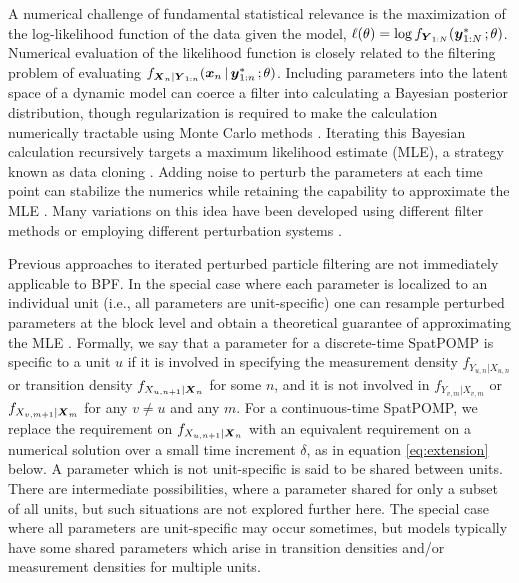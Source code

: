 \documentclass[12pt]{article}\usepackage[]{graphicx}\usepackage[]{xcolor}
\begin{document}
A numerical challenge of fundamental statistical relevance is the maximization of the log-likelihood function of the data given the model, $\ell(\theta)=\log f_{\boldsymbol{Y}_{1:N}}(\boldsymbol{y}^*_{1:N}{\hspace{0.5mm};\hspace{0.5mm}} \theta)$.
Numerical evaluation of the likelihood function is closely related to the filtering problem of evaluating $f_{\boldsymbol{X}_n|\boldsymbol{Y}_{1:n}}(\boldsymbol{x}_n{\,\vert\,} \boldsymbol{y}^*_{1:n}{\hspace{0.5mm};\hspace{0.5mm}} \theta)$.
Including parameters into the latent space of a dynamic model can coerce a filter into calculating a Bayesian posterior distribution, though regularization is required to make the calculation numerically tractable using Monte Carlo methods \citep{kitagawa98,janeliu01}.
Iterating this Bayesian calculation recursively targets a maximum likelihood estimate (MLE), a strategy known as data cloning \citep{lele07,lele10}.
Adding noise to perturb the parameters at each time point can stabilize the numerics while retaining the capability to approximate the MLE \citep{ionides06-pnas,ionides11,ionides15}.
Many variations on this idea have been developed using different filter methods \citep{park20,li20,ionides21,manoli15} or employing different perturbation systems \citep{doucet13,nguyen17}.

Previous approaches to iterated perturbed particle filtering are not immediately applicable to BPF.
In the special case where each parameter is localized to an individual unit (i.e., all parameters are unit-specific) one can resample perturbed parameters at the block level and obtain a theoretical guarantee of approximating the MLE \citep{ning21-ibpf}.
Formally, we say that a parameter for a discrete-time SpatPOMP is specific to a unit $u$ if it is involved in specifying the measurement density $f_{Y_{u,n}|X_{u,n}}$ or transition density $f_{X_{u,n+1}|\boldsymbol{X}_n}$ for some $n$, and it is not involved in $f_{Y_{v,m}|X_{v,m}}$ or $f_{X_{v,m+1}|\boldsymbol{X}_m}$ for any $v\neq u$ and any $m$.
For a continuous-time SpatPOMP, we replace the requirement on $f_{X_{u,n+1}|\boldsymbol{X}_n}$ with an equivalent requirement on a numerical solution over a small time increment $\delta$, as in equation \eqref{eq:extension} below.
A parameter which is not unit-specific is said to be shared between units.
There are intermediate possibilities, where a parameter shared for only a subset of all units, but such situations are not explored further here.
The special case where all parameters are unit-specific may occur sometimes, but models typically have some shared parameters which arise in transition densities and/or measurement densities for multiple units. 
\end{document}
